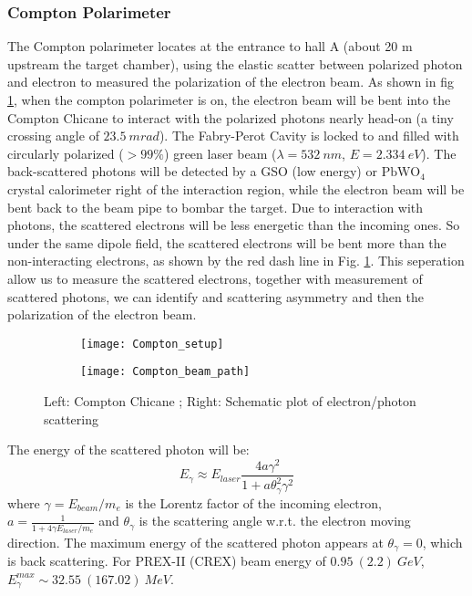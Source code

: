 \subsubsection{Compton Polarimeter}
The Compton polarimeter locates at the entrance to hall A (about 20 m upstream the 
target chamber), using the elastic scatter between polarized photon and electron
to measured the polarization of the electron beam. As shown in fig \ref{fig:compton_pol},
when the compton polarimeter is on, the electron beam will be bent into the 
Compton Chicane to interact with the polarized photons nearly head-on (a tiny
crossing angle of $23.5\ mrad$). The Fabry-Perot Cavity
is locked to and filled with circularly polarized ($> 99\%$) green laser beam
($\lambda = 532\ nm$, $E = 2.334\ eV$).
The back-scattered photons will be
detected by a GSO (low energy) or $\text{PbWO}_4$ crystal calorimeter right of the interaction region, while the
electron beam will be bent back to the beam pipe to bombar the target. Due to
interaction with photons, the scattered electrons will be less energetic than
the incoming ones. So under the same dipole field, the scattered electrons will
be bent more than the non-interacting electrons, as shown by the red dash line 
in Fig. \ref{fig:compton_pol}. This 
seperation allow us to measure the scattered electrons, together with measurement
of scattered photons, we can identify and scattering asymmetry and then the polarization
of the electron beam.
\begin{figure}[h!]
    \begin{subfigure}[c]{0.55\linewidth}
	\texttt{[image: Compton\_setup]}
    \end{subfigure}
    \begin{subfigure}[c]{0.55\linewidth}
	\texttt{[image: Compton\_beam\_path]}
    \end{subfigure}
    \caption{Left: Compton Chicane \cite{PhysRevSTAB.7.042802}; 
    Right: Schematic plot of electron/photon scattering} 
    \label{fig:compton_pol}
\end{figure}

The energy of the scattered photon will be:
\begin{equation}
    E_\gamma \approx E_{laser} \frac{4a\gamma^2}{1 + a\theta^2_\gamma \gamma^2}
\end{equation}
where $\gamma = E_{beam}/m_e$ is the Lorentz factor of the incoming electron, 
$a = \frac{1}{1 + 4\gamma E_{laser}/m_e}$ and $\theta_\gamma$ is the scattering
angle w.r.t. the electron moving direction. The maximum energy of the scattered
photon appears at $\theta_\gamma = 0$, which is back scattering. 
For PREX-II (CREX) beam energy of $0.95\ (2.2)\ GeV$, $E_\gamma^{max} \sim 32.55 \ (167.02)\ MeV$.

